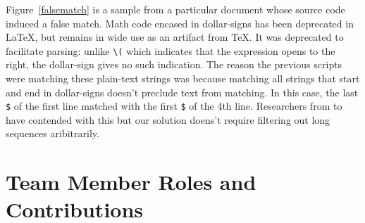 \documentclass[12pt]{article}
\begin{document}
\begin{appendix}
Figure~\ref{falsematch} is a sample from a particular document whose source code
induced a false match. Math code encased in dollar-signs has been deprecated in
\LaTeX{}, but remains in wide use as an artifact from \TeX{}. It was deprecated
to facilitate parsing: unlike \verb|\(| which indicates that the expression
opens to the right, the dollar-sign gives no such indication. The reason the
previous scripts were matching these plain-text strings was because matching all
strings that start and end in dollar-signs doesn't preclude text from matching.
In this case, the last \verb|$| of the first line matched with the first
\verb|$| of the 4th line. Researchers from \cite[4]{deng2016you} to
\cite{singh2018teaching} have contended with this but our solution doens't
require filtering out long sequences aribitrarily.

  \section{Team Member Roles and Contributions}

\end{appendix}
\end{document}
